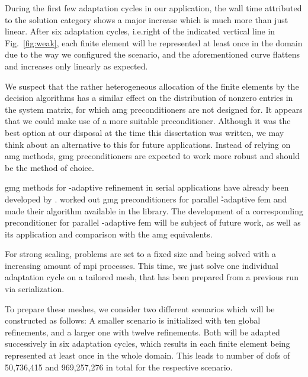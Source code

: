 During the first few adaptation cycles in our application, the wall time attributed to the solution category shows a major increase which is much more than just linear. After six adaptation cycles, i.e.\@ right of the indicated vertical line in Fig.~\ref{fig:weak}, each finite element will be represented at least once in the domain due to the way we configured the scenario, and the aforementioned curve flattens and increases only linearly as expected.



We suspect that the rather heterogeneous allocation of the finite elements by the decision algorithms
has a similar effect on the distribution of nonzero entries in the system matrix, for which \gls{amg} preconditioners are not designed for. It appears that we could make use of a more suitable preconditioner. Although it was the best option at our disposal at the time this dissertation was written, we may think about an alternative to this for future applications. Instead of relying on \gls{amg} methods, \gls{gmg} preconditioners are expected to work more robust and should be the method of choice.

\Gls{gmg} methods for \hp-adaptive refinement in serial applications have already been developed by \textcite{mitchell2010}. \textcite{clevenger2019} worked out \gls{gmg} preconditioners for parallel \h-adaptive \gls{fem} and made their algorithm available in the \dealii{} library. The development of a corresponding preconditioner for parallel \hp-adaptive \gls{fem} will be subject of future work, as well as its application and comparison with the \gls{amg} equivalents.



For strong scaling, problems are set to a fixed size and being solved with a increasing amount of \gls{mpi} processes. This time, we just solve one individual adaptation cycle on a tailored mesh, that has been prepared from a previous run via serialization.

To prepare these meshes, we consider two different scenarios which will be constructed as follows: A smaller scenario is initialized with ten global refinements, and a larger one with twelve refinements. Both will be adapted successively in six adaptation cycles, which results in each finite element being represented at least once in the whole domain. This leads to number of \glspl{dof} of 50,736,415 and 969,257,276 in total for the respective scenario.

